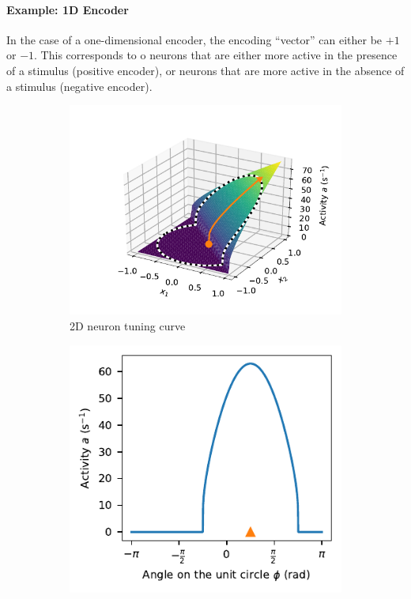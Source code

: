 \documentclass[10pt,letterpaper,oneside]{article}
\begin{document}
\paragraph{Example: 1D Encoder}
In the case of a one-dimensional encoder, the encoding \enquote{vector} can either be $+1$ or $-1$. This corresponds to o neurons that are either more active in the presence of a stimulus (positive encoder), or neurons that are more active in the absence of a stimulus (negative encoder).

\begin{figure}
	\begin{subfigure}{0.5\textwidth}
		\centering
		\includegraphics[trim=1cm 0 0 1cm,clip]{media/2d_encoder_tuning_curve.pdf}
		\caption{2D neuron tuning curve}
		\label{fig:2d_encoder_tuning_curve}
	\end{subfigure}
	\begin{subfigure}{0.5\textwidth}
		\centering
		\includegraphics{media/2d_encoder_tuning_curve_unit.pdf}

\end{subfigure}
\end{figure}
\end{document}
